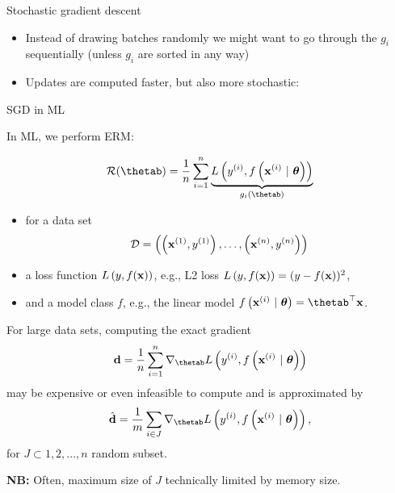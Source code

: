 \documentclass[11pt,compress,t,notes=noshow, xcolor=table]{beamer}
\begin{document}
\begin{vbframe}{Stochastic gradient descent}
\begin{itemize}
    \footnotesize
    \item Instead of drawing batches randomly we might want to go through the $g_i$ sequentially (unless $g_i$ are sorted in any way)
    \item Updates are computed faster, but also more stochastic: 
    \begin{itemize} 
    \end{itemize} 
\end{itemize}

\end{vbframe}

\begin{vbframe}{SGD in ML}

In ML, we perform ERM:  

$$
    \risk(\thetab) = \frac{1}{n}\sumin \underbrace{\Lxyit}_{g_i(\thetab)}
$$

\begin{itemize}
    \item for a data set 
    $$\mathcal{D} = \left( \left(\mathbf{x}^{(1)}, y^{(1)}\right), \ldots, \left(\mathbf{x}^{(n)}, y^{(n)}\right)\right)$$
    \item a loss function $L\left(y, f(\mathbf{x})\right)$, e.g., L2 loss $L\left(y, f(\mathbf{x})\right) = (y - f(\mathbf{x}))^2$,
    \item and a model class $f$, e.g., the linear model $\fxit = \thetab^\top \xv$. 
\end{itemize}

\framebreak 

For large data sets, computing the exact gradient 
$$
    \mathbf{d} = \frac{1}{n}\sum_{i=1}^n \nabla_{\thetab} \Lxyit %
$$ 
may be expensive or even infeasible to compute and is approximated by 
$$
\hat{\mathbf{d}} = \frac{1}{m}\sum_{i \in J} \nabla_{\thetab} \Lxyit,
$$
    for $J \subset{1, 2, ..., n}$ random subset. 

    \lz 
    
\textbf{NB:} Often, maximum size of $J$ technically limited by memory size.
\end{vbframe}
\end{document}
